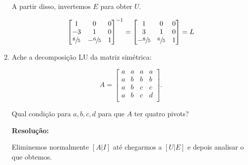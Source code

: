 \documentclass[leqno]{article}
\begin{document}
\begin{enumerate}
    A partir disso, invertemos $E$ para obter $U$.
    
    \begin{align*}
    \begin{bmatrix}
    1 & 0 & 0\\
    -3 & 1 & 0\\
    \sfrac{8}{5} & -\sfrac{6}{5} & 1\\
    \end{bmatrix}^{-1}=\begin{bmatrix}
    1 & 0 & 0\\
    3 & 1 & 0\\
    -\sfrac{8}{5} & \sfrac{6}{5} & 1\\
    \end{bmatrix}=L
    \end{align*}
    
    \item Ache a decomposição LU da matriz simétrica:
    
    $$A=\begin{bmatrix}
    a & a & a & a\\
    a & b & b & b\\
    a & b & c & c\\
    a & b & c & d\\
    \end{bmatrix}\text{.}$$
    
    Qual condição para $a,b,c,d$ para que $A$ ter quatro pivots?
    
    \textbf{Resolução:}

    Eliminemos normalmente $[A|I]$ até chegarmos a $[U|E]$ e depois analisar o que obtemos.
    

\end{enumerate}
\end{document}
